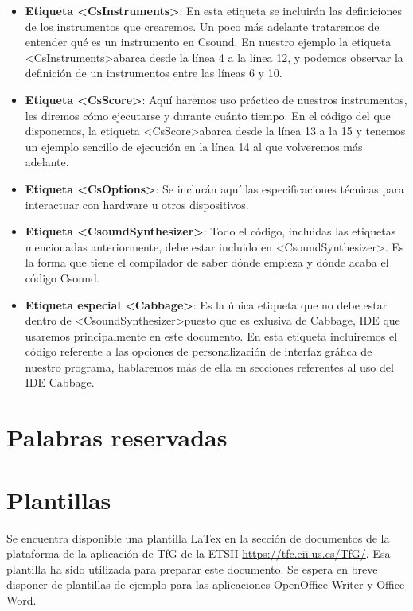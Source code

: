 \begin{itemize}
 \item \textbf{Etiqueta \textless CsInstruments\textgreater}: En esta etiqueta se incluirán las definiciones de los instrumentos que crearemos. Un poco más adelante trataremos de entender qué es un instrumento en Csound. En nuestro ejemplo la etiqueta \textless CsInstruments\textgreater abarca desde la línea 4 a la línea 12, y podemos observar la definición de un instrumentos entre las líneas 6 y 10.
 \item \textbf{Etiqueta \textless CsScore\textgreater}: Aquí haremos uso práctico de nuestros instrumentos, les diremos cómo ejecutarse y durante cuánto tiempo. En el código del que disponemos, la etiqueta \textless CsScore\textgreater abarca desde la línea 13 a la 15 y tenemos un ejemplo sencillo de ejecución en la línea 14 al que volveremos más adelante.
 \item \textbf{Etiqueta \textless CsOptions\textgreater}: Se inclurán aquí las especificaciones técnicas para interactuar con hardware u otros dispositivos.
 \item \textbf{Etiqueta \textless CsoundSynthesizer\textgreater}: Todo el código, incluidas las etiquetas mencionadas anteriormente, debe estar incluido en \textless CsoundSynthesizer\textgreater. Es la forma que tiene el compilador de saber dónde empieza y dónde acaba el código Csound.
 \item \textbf{Etiqueta especial \textless Cabbage\textgreater}: Es la única etiqueta que no debe estar dentro de \textless CsoundSynthesizer\textgreater puesto que es exlusiva de Cabbage, IDE que usaremos principalmente en este documento. En esta etiqueta incluiremos el código referente a las opciones de personalización de interfaz gráfica de nuestro programa, hablaremos más de ella en secciones referentes al uso del IDE Cabbage.
\end{itemize}

\section{Palabras reservadas}\label{sec:reservadas} 



\section{Plantillas}\label{sec:plantillas} 

Se encuentra disponible una plantilla LaTex en la secci\'on de documentos de la plataforma
de la aplicaci\'on de TfG de la ETSII 
\url{https://tfc.eii.us.es/TfG/}. Esa plantilla ha sido utilizada para preparar este documento.
Se espera en breve disponer de plantillas de ejemplo para las aplicaciones OpenOffice Writer y Office Word.

